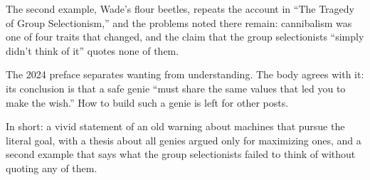 \begin{afterword}
The second example, Wade's flour beetles, repeats the account in ``The Tragedy of Group Selectionism,'' and the problems noted there remain: cannibalism was one of four traits that changed, and the claim that the group selectionists ``simply didn't think of it'' quotes none of them.

The 2024 preface separates wanting from understanding. The body agrees with it: its conclusion is that a safe genie ``must share the same values that led you to make the wish.'' How to build such a genie is left for other posts.

In short: a vivid statement of an old warning about machines that pursue the literal goal, with a thesis about all genies argued only for maximizing ones, and a second example that says what the group selectionists failed to think of without quoting any of them.
\end{afterword}
